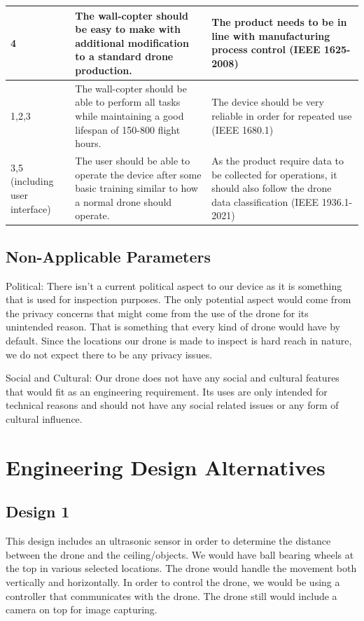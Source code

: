 \documentclass[12pt]{article}
\begin{document}
\begin{longtable}{ | m{4.25cm} | m{5cm}| m{5.4cm} | }
            4 &
            The wall-copter should be easy to make with additional modification to a standard drone production. &
            The product needs to be in line with manufacturing process control (IEEE 1625-2008) \\\hline
            1,2,3 &
            The wall-copter should be able to perform all tasks while maintaining a good lifespan of 150-800 flight hours. &
            The device should be very reliable in order for repeated use (IEEE 1680.1) \\\hline
            3,5 (including user interface) &
            The user should be able to operate the device after some basic training similar to how a normal drone should operate. &
            As the product require data to be collected for operations, it should also follow the drone data classification (IEEE 1936.1-2021) \\\hline
        \end{longtable}

        \subsection{Non-Applicable Parameters}
            Political: There isn't a current political aspect to our device as it is something that is used for inspection purposes.
            The only potential aspect would come from the privacy concerns that might come from the use of the drone for its unintended reason.
            That is something that every kind of drone would have by default.
            Since the locations our drone is made to inspect is hard reach in nature, we do not expect there to be any privacy issues.

            Social and Cultural: Our drone does not have any social and cultural features that would fit as an engineering requirement.
            Its uses are only intended for technical reasons and should not have any social related issues or any form of cultural influence.
    
    \newpage
    \section{Engineering Design Alternatives}
        \subsection{Design 1}
            This design includes an ultrasonic sensor in order to determine the distance between the drone and the ceiling/objects.
            We would have ball bearing wheels at the top in various selected locations.
            The drone would handle the movement both vertically and horizontally.
            In order to control the drone, we would be using a controller that communicates with the drone.
            The drone still would include a camera on top for image capturing.
\end{document}
